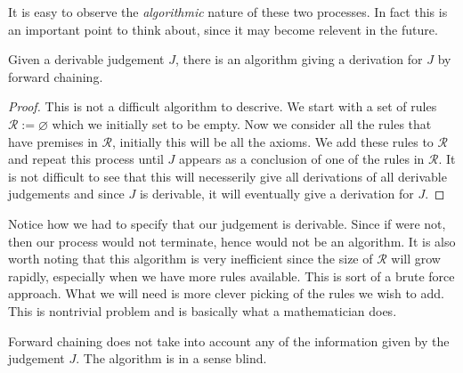It is easy to observe the \emph{algorithmic} nature of these two processes. In fact this is an important point to think about, since it may become relevent in the future.

\begin{lemma}
    Given a derivable judgement $J$, there is an algorithm giving a derivation for $J$ by forward chaining.
\end{lemma}

\begin{proof}
    This is not a difficult algorithm to descrive. We start with a set of rules $\mathcal{R} := \varnothing $ which we initially set to be empty. Now we consider all the rules that have premises in $\mathcal{R}$, initially this will be all the axioms. We add these rules to $\mathcal{R}$ and repeat this process until $J$ appears as a conclusion of one of the rules in $\mathcal{R}$. It is not difficult to see that this will necesserily give all derivations of all derivable judgements and since $J$ is derivable, it will eventually give a derivation for $J$.
\end{proof}

\begin{remark}
    Notice how we had to specify that our judgement is derivable. Since if were not, then our process would not terminate, hence would not be an algorithm. It is also worth noting that this algorithm is very inefficient since the size of $\mathcal{R}$ will grow rapidly, especially when we have more rules available. This is sort of a brute force approach. What we will need is more clever picking of the rules we wish to add. This is nontrivial problem and is basically what a mathematician does.
\end{remark}

Forward chaining does not take into account any of the information given by the judgement $J$. The algorithm is in a sense blind. 







